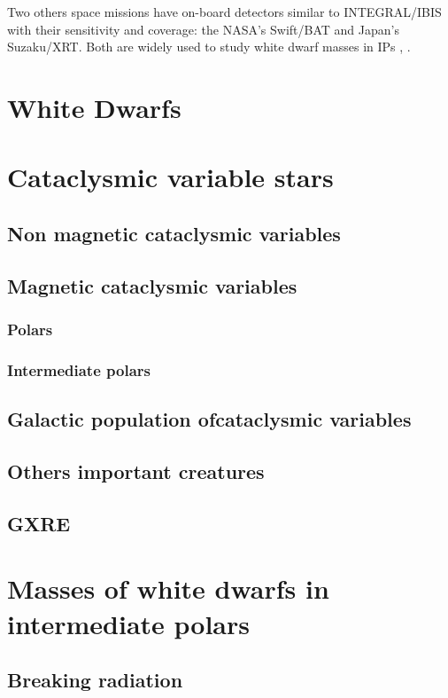 \documentclass[oneside,a4paper,11pt]{report}
\begin{document}
Two others space missions have on-board detectors similar to INTEGRAL/IBIS with their sensitivity 
and coverage: the NASA's Swift/BAT and Japan's Suzaku/XRT. Both are widely used to study white dwarf 
masses in IPs \citet{2009A&A...496..121B}, \citet{2010A&A...520A..25Y}.    



\chapter{White Dwarfs}


\chapter{Cataclysmic variable stars}
\section{Non magnetic cataclysmic variables} 
\section{Magnetic cataclysmic variables}
\subsection{Polars}
\subsection{Intermediate polars}
\section{Galactic population ofcataclysmic variables }
\section{Others important creatures}
\section{GXRE}



\chapter{Masses of white dwarfs in intermediate polars}
\section{Breaking radiation}
\end{document}
